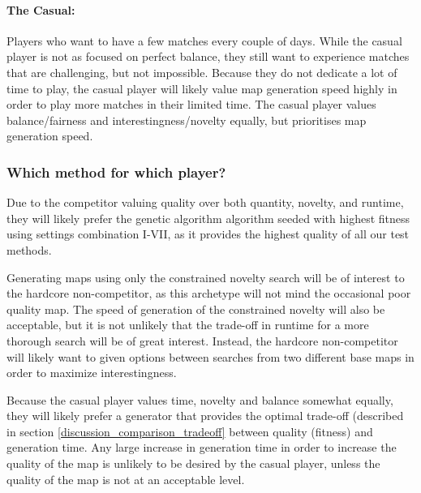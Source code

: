 \paragraph{The Casual:} Players who want to have a few matches every couple of days. While the casual player is not as focused on perfect balance, they still want to experience matches that are challenging, but not impossible. Because they do not dedicate a lot of time to play, the casual player will likely value map generation speed highly in order to play more matches in their limited time. The casual player values balance/fairness and interestingness/novelty equally, but prioritises map generation speed.

\subsubsection{Which method for which player?}
Due to the competitor valuing quality over both quantity, novelty, and runtime, they will likely prefer the genetic algorithm algorithm seeded with highest fitness using settings combination I-VII, as it provides the highest quality of all our test methods.

Generating maps using only the constrained novelty search will be of interest to the hardcore non-competitor, as this archetype will not mind the occasional poor quality map. The speed of generation of the constrained novelty will also be acceptable, but it is not unlikely that the trade-off in runtime for a more thorough search will be of great interest. Instead, the hardcore non-competitor will likely want to given options between searches from two different base maps in order to maximize interestingness.

Because the casual player values time, novelty and balance somewhat equally, they will likely prefer a generator that provides the optimal trade-off (described in section \ref{discussion_comparison_tradeoff} between quality (fitness) and generation time. Any large increase in generation time in order to increase the quality of the map is unlikely to be desired by the casual player, unless the quality of the map is not at an acceptable level.